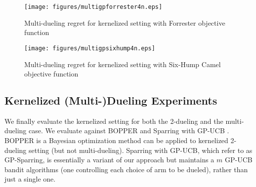 \begin{figure}[t]
\centering
\texttt{[image: figures/multigpforrester4n.eps]}
\vspace{-0.1in}
\caption{Multi-dueling regret for kernelized setting with Forrester objective function}
\label{fig:multiforrester}
\vspace{-0.05in}
\end{figure}

\begin{figure}[t]
\centering
\texttt{[image: figures/multigpsixhump4n.eps]}
\vspace{-0.1in}
\caption{Multi-dueling regret for kernelized setting with Six-Hump Camel objective function}
\label{fig:multisixhump}
\vspace{-0.05in}
\end{figure}







\subsection{Kernelized (Multi-)Dueling Experiments}

We finally evaluate the kernelized setting for both the 2-dueling and the multi-dueling case.
We evaluate \kersparring against BOPPER \citep{gonzalez2016bayesian} and Sparring \citep{ailon2014reducing} with GP-UCB \citep{srinivas10}. BOPPER is a Bayesian optimization method can be applied to kernelized 2-dueling setting (but not multi-dueling).  Sparring with GP-UCB, which refer to as GP-Sparring, is essentially a variant of our \kersparring approach but maintains a $m$ GP-UCB bandit algorithms (one controlling each choice of arm to be dueled), rather than just a single one.

